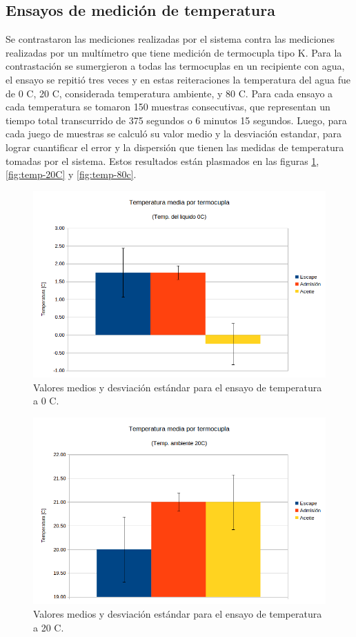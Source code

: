 \subsection{Ensayos de medición de temperatura}

Se contrastaron las mediciones realizadas por el sistema contra las mediciones realizadas por un multímetro que tiene medición de termocupla tipo K. Para la contrastación se sumergieron a todas las termocuplas en un recipiente con agua, el ensayo se repitió tres veces y en estas reiteraciones la temperatura del agua fue de 0 \degree C, 20 \degree C, considerada temperatura ambiente, y 80 \degree C. Para cada ensayo a cada temperatura se tomaron 150 muestras consecutivas, que representan un tiempo total transcurrido de 375 segundos o 6 minutos 15 segundos. Luego, para cada juego de muestras se calculó su valor medio y la desviación estandar, para lograr cuantificar el error y la dispersión que tienen las medidas de temperatura tomadas por el sistema. Estos resultados están plasmados en las figuras \ref{fig:temp-0c}, \ref{fig:temp-20C} y \ref{fig:temp-80c}.

\begin{figure}[htpb]
\centering
\includegraphics[width=.9\textwidth]{./Figures/temp-0c.png}
\caption{Valores medios y desviación estándar para el ensayo de temperatura a 0 \degree C.}
\label{fig:temp-0c}
\end{figure}

\begin{figure}[htpb]
\centering
\includegraphics[width=.9\textwidth]{./Figures/temp-20c.png}
\caption{Valores medios y desviación estándar para el ensayo de temperatura a 20 \degree C.}
\label{fig:temp-20c}
\end{figure}

